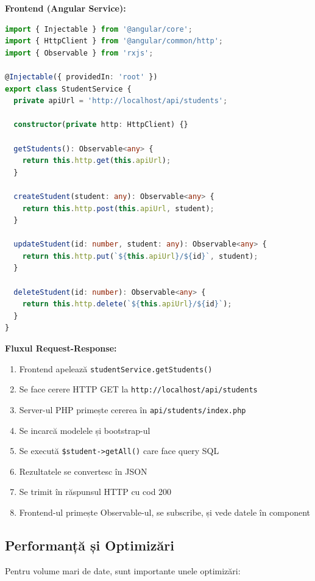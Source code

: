 \textbf{Frontend (Angular Service):}

\begin{lstlisting}[language=TypeScript]
import { Injectable } from '@angular/core';
import { HttpClient } from '@angular/common/http';
import { Observable } from 'rxjs';

@Injectable({ providedIn: 'root' })
export class StudentService {
  private apiUrl = 'http://localhost/api/students';

  constructor(private http: HttpClient) {}

  getStudents(): Observable<any> {
    return this.http.get(this.apiUrl);
  }

  createStudent(student: any): Observable<any> {
    return this.http.post(this.apiUrl, student);
  }

  updateStudent(id: number, student: any): Observable<any> {
    return this.http.put(`${this.apiUrl}/${id}`, student);
  }

  deleteStudent(id: number): Observable<any> {
    return this.http.delete(`${this.apiUrl}/${id}`);
  }
}
\end{lstlisting}

\textbf{Fluxul Request-Response:}

\begin{enumerate}
    \item Frontend apelează \texttt{studentService.getStudents()}
    \item Se face cerere HTTP GET la \texttt{http://localhost/api/students}
    \item Server-ul PHP primește cererea în \texttt{api/students/index.php}
    \item Se incarcă modelele și bootstrap-ul
    \item Se execută \texttt{\$student->getAll()} care face query SQL
    \item Rezultatele se convertesc în JSON
    \item Se trimit în răspunsul HTTP cu cod 200
    \item Frontend-ul primește Observable-ul, se subscribe, și vede datele în component
\end{enumerate}

\subsection{Performanță și Optimizări}

Pentru volume mari de date, sunt importante unele optimizări:


